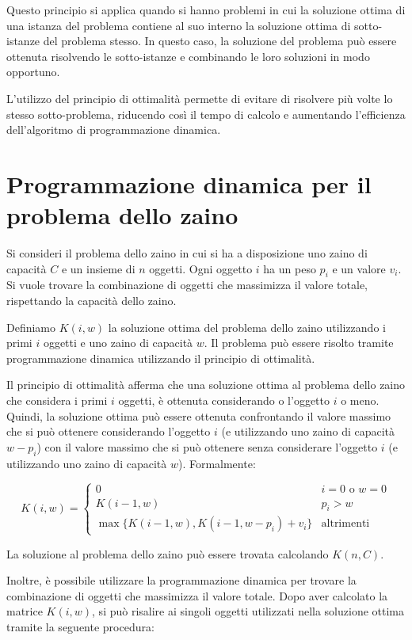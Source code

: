 Questo principio si applica quando si hanno problemi in cui la soluzione ottima di una istanza del problema contiene al suo interno la soluzione ottima di sotto-istanze del problema stesso. In questo caso, la soluzione del problema può essere ottenuta risolvendo le sotto-istanze e combinando le loro soluzioni in modo opportuno.

L'utilizzo del principio di ottimalità permette di evitare di risolvere più volte lo stesso sotto-problema, riducendo così il tempo di calcolo e aumentando l'efficienza dell'algoritmo di programmazione dinamica.


\section{Programmazione dinamica per il problema dello zaino}


Si consideri il problema dello zaino in cui si ha a disposizione uno zaino di capacità $C$ e un insieme di $n$ oggetti. Ogni oggetto $i$ ha un peso $p_i$ e un valore $v_i$. Si vuole trovare la combinazione di oggetti che massimizza il valore totale, rispettando la capacità dello zaino.

Definiamo $K(i, w)$ la soluzione ottima del problema dello zaino utilizzando i primi $i$ oggetti e uno zaino di capacità $w$. Il problema può essere risolto tramite programmazione dinamica utilizzando il principio di ottimalità.

Il principio di ottimalità afferma che una soluzione ottima al problema dello zaino che considera i primi $i$ oggetti, è ottenuta considerando o l'oggetto $i$ o meno. Quindi, la soluzione ottima può essere ottenuta confrontando il valore massimo che si può ottenere considerando l'oggetto $i$ (e utilizzando uno zaino di capacità $w-p_i$) con il valore massimo che si può ottenere senza considerare l'oggetto $i$ (e utilizzando uno zaino di capacità $w$). Formalmente:

\[
K(i, w) = 
\begin{cases} 
0 & i = 0 \text{ o } w = 0 \\
K(i-1, w) & p_i > w \\
\max \{ K(i-1, w), K(i-1, w-p_i) + v_i \} & \text{altrimenti}
\end{cases}
\]

La soluzione al problema dello zaino può essere trovata calcolando $K(n, C)$.

Inoltre, è possibile utilizzare la programmazione dinamica per trovare la combinazione di oggetti che massimizza il valore totale. Dopo aver calcolato la matrice $K(i,w)$, si può risalire ai singoli oggetti utilizzati nella soluzione ottima tramite la seguente procedura:


